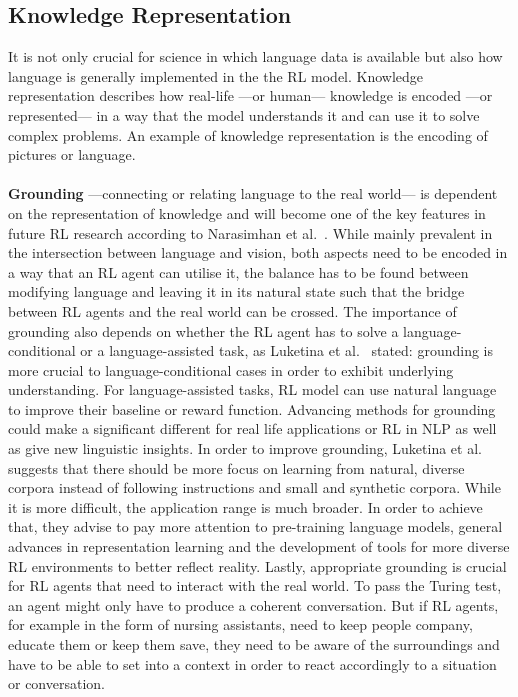 \documentclass[11pt]{article}
\begin{document}
\subsection{Knowledge Representation}\label{knowledgerepresentation}
It is not only crucial for science in which language data is available but also how language is generally implemented in the the RL model. Knowledge representation describes how real-life ---or human--- knowledge is encoded ---or represented--- in a way that the model understands it and can use it to solve complex problems. An example of knowledge representation is the encoding of pictures or language.\\\\
\textbf{Grounding} ---connecting or relating language to the real world--- is dependent on the representation of knowledge and will become one of the key features in future RL research according to Narasimhan et al.~. While mainly prevalent in the intersection between language and vision, both aspects need to be encoded in a way that an RL agent can utilise it, the balance has to be found between modifying language and leaving it in its natural state such that the bridge between RL agents and the real world can be crossed. The importance of grounding also depends on whether the RL agent has to solve a language-conditional or a language-assisted task, as Luketina et al.~ stated: grounding is more crucial to language-conditional cases in order to exhibit underlying understanding. For language-assisted tasks, RL model can use natural language to improve their baseline or reward function. Advancing methods for grounding could make a significant different for real life applications or RL in NLP as well as give new linguistic insights. In order to improve grounding, Luketina et al.
~ suggests that there should be more focus on learning from natural, diverse corpora instead of following instructions and small and synthetic corpora. While it is more difficult, the application range is much broader. In order to achieve that, they advise to pay more attention to pre-training language models, general advances in representation learning and the development of tools for more diverse RL environments to better reflect reality. Lastly, appropriate grounding is crucial for RL agents that need to interact with the real world. To pass the Turing test, an agent might only have to produce a coherent conversation. But if RL agents, for example in the form of nursing assistants, need to keep people company, educate them or keep them save, they need to be aware of the surroundings and have to be able to set into a context in order to react accordingly to a situation or conversation. 
\end{document}
